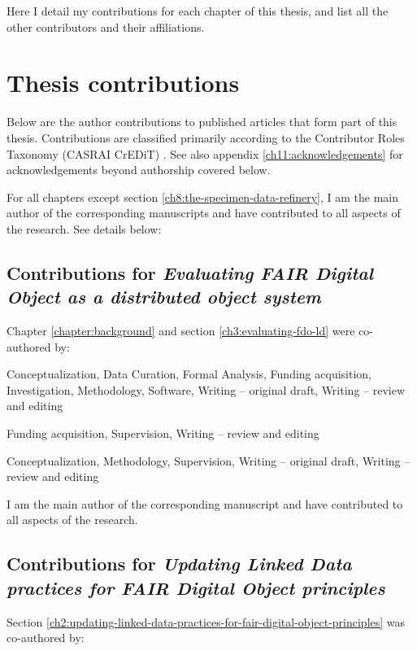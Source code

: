 \label{ch10:contributions} 

Here I detail my contributions for each chapter of this thesis, and
list all the other contributors and their affiliations.



\section{Thesis contributions}\label{ch10:my-contributions}

Below are the author contributions to published articles that form part
of this thesis. Contributions are classified primarily according to the
Contributor Roles Taxonomy (CASRAI CrEDiT) \cite{Brand 2015}. See 
also appendix \vref{ch11:acknowledgements} for acknowledgements beyond authorship covered below.

For all chapters except section \ref{ch8:the-specimen-data-refinery}, I am the main author of the corresponding
manuscripts and have contributed to all aspects of the research. See details below:



\subsection{Contributions for \emph{Evaluating FAIR Digital
Object as a distributed object system}}\label{ch10:fdo}

Chapter \vref{chapter:background} and section \vref{ch3:evaluating-fdo-ld} were co-authored by:

\begin{description}
\tightlist
\item[Stian Soiland-Reyes]
Conceptualization, Data Curation, Formal Analysis, Funding acquisition, Investigation,
Methodology, Software, Writing -- original draft, Writing -- review and
editing
\item[Carole Goble]
Funding acquisition, Supervision, Writing -- review and editing
\item[Paul Groth]
Conceptualization, Methodology, Supervision, Writing -- original draft, Writing -- review
and editing
\end{description}

I am the main author of the corresponding manuscript and have contributed to all aspects of the research. 


\subsection{Contributions for \emph{Updating
Linked Data practices for FAIR Digital Object principles}}\label{ch10:updating-ld}
Section \vref{ch2:updating-linked-data-practices-for-fair-digital-object-principles} was co-authored by:

